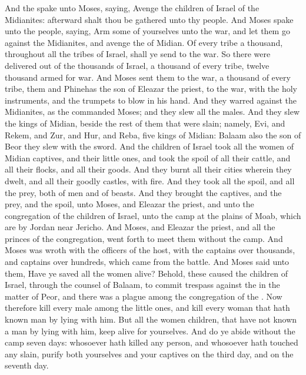 \begin{biblechapter} %
 And the \LORD spake unto Moses, saying,
\verse Avenge the children of Israel of the Midianites: afterward shalt thou be gathered unto thy people.
\verse And Moses spake unto the people, saying, Arm some of yourselves unto the war, and let them go against the Midianites, and avenge the \LORD of Midian.
\verse Of every tribe a thousand, throughout all the tribes of Israel, shall ye send to the war.
\verse So there were delivered out of the thousands of Israel, a thousand of every tribe, twelve thousand armed for war.
\verse And Moses sent them to the war, a thousand of every tribe, them and Phinehas the son of Eleazar the priest, to the war, with the holy instruments, and the trumpets to blow in his hand.
\verse And they warred against the Midianites, as the \LORD commanded Moses; and they slew all the males.
\verse And they slew the kings of Midian, beside the rest of them that were slain; namely, Evi, and Rekem, and Zur, and Hur, and Reba, five kings of Midian: Balaam also the son of Beor they slew with the sword.
\verse And the children of Israel took all the women of Midian captives, and their little ones, and took the spoil of all their cattle, and all their flocks, and all their goods.
\verse And they burnt all their cities wherein they dwelt, and all their goodly castles, with fire.
\verse And they took all the spoil, and all the prey, both of men and of beasts.
\verse And they brought the captives, and the prey, and the spoil, unto Moses, and Eleazar the priest, and unto the congregation of the children of Israel, unto the camp at the plains of Moab, which are by Jordan near Jericho.
\verse And Moses, and Eleazar the priest, and all the princes of the congregation, went forth to meet them without the camp.
\verse And Moses was wroth with the officers of the host, with the captains over thousands, and captains over hundreds, which came from the battle.
\verse And Moses said unto them, Have ye saved all the women alive?
\verse Behold, these caused the children of Israel, through the counsel of Balaam, to commit trespass against the \LORD in the matter of Peor, and there was a plague among the congregation of the \LORD.
\verse Now therefore kill every male among the little ones, and kill every woman that hath known man by lying with him.
\verse But all the women children, that have not known a man by lying with him, keep alive for yourselves.
\verse And do ye abide without the camp seven days: whosoever hath killed any person, and whosoever hath touched any slain, purify both yourselves and your captives on the third day, and on the seventh day.

\end{biblechapter}
